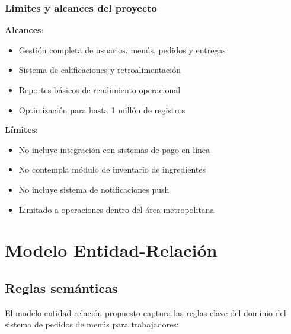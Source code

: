 \documentclass[12pt,a4paper]{article}
\begin{document}
\subsubsection{Límites y alcances del proyecto}
\textbf{Alcances}:
\begin{itemize}
    \item Gestión completa de usuarios, menús, pedidos y entregas
    \item Sistema de calificaciones y retroalimentación
    \item Reportes básicos de rendimiento operacional
    \item Optimización para hasta 1 millón de registros
\end{itemize}

\textbf{Límites}:
\begin{itemize}
    \item No incluye integración con sistemas de pago en línea
    \item No contempla módulo de inventario de ingredientes
    \item No incluye sistema de notificaciones push
    \item Limitado a operaciones dentro del área metropolitana
\end{itemize}


\section{Modelo Entidad-Relación}
\subsection{Reglas semánticas}
El modelo entidad-relación propuesto captura las reglas clave del dominio del sistema de pedidos de menús para trabajadores:
\end{document}
